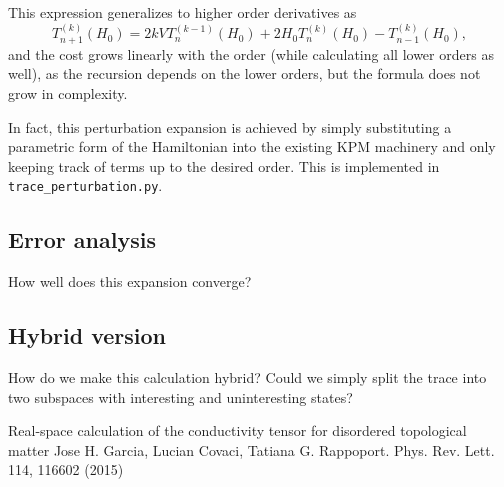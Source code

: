 \documentclass[10pt, onecolumn, aps, prb, superscriptaddress, floatfix, showpacs, notitlepage]{revtex4-1}
\begin{document}
This expression generalizes to higher order derivatives as
\begin{equation}
T_{n+1}^{(k)}(H_0) = 2 k V T_n^{(k-1)}(H_0) + 2 H_0 T_n^{(k)}(H_0) - T_{n-1}^{(k)}(H_0),
\end{equation}
and the cost grows linearly with the order (while calculating all lower orders as well), as the recursion depends on the lower orders, but the formula does not grow in complexity.

In fact, this perturbation expansion is achieved by simply substituting a parametric form of the Hamiltonian into the existing KPM machinery and only keeping track of terms up to the desired order.
This is implemented in \texttt{trace\_perturbation.py}.

\subsection{Error analysis}
How well does this expansion converge?

\subsection{Hybrid version}
How do we make this calculation hybrid?
Could we simply split the trace into two subspaces with interesting and uninteresting states?




\begin{thebibliography}{2}
Real-space calculation of the conductivity tensor for disordered topological matter
Jose H. Garcia, Lucian Covaci, Tatiana G. Rappoport. Phys. Rev. Lett. 114, 116602 (2015)
\end{thebibliography}
\end{document}
